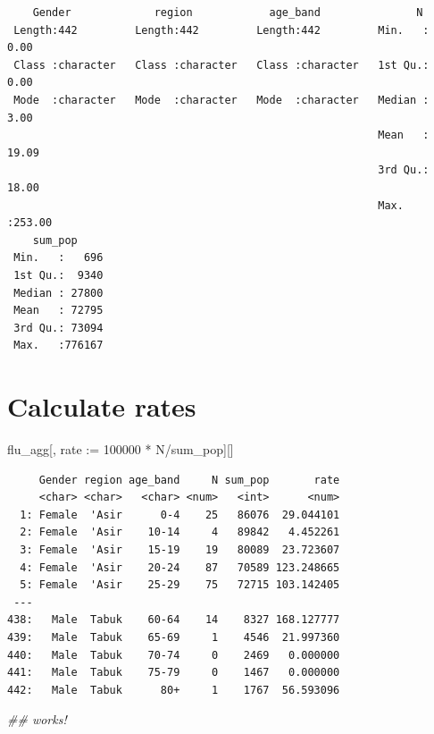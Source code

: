 \documentclass[
  letterpaper,
  DIV=11,
  numbers=noendperiod]{scrreprt}
\newenvironment{Shaded}{\begin{snugshade}}{\end{snugshade}}
\newcommand{\DecValTok}[1]{\textcolor[rgb]{0.68,0.00,0.00}{#1}}
\newcommand{\DocumentationTok}[1]{\textcolor[rgb]{0.37,0.37,0.37}{\textit{#1}}}
\newcommand{\ErrorTok}[1]{\textcolor[rgb]{0.68,0.00,0.00}{#1}}
\newcommand{\NormalTok}[1]{\textcolor[rgb]{0.00,0.23,0.31}{#1}}
\newcommand{\SpecialCharTok}[1]{\textcolor[rgb]{0.37,0.37,0.37}{#1}}
\begin{document}
\begin{verbatim}
    Gender             region            age_band               N         
 Length:442         Length:442         Length:442         Min.   :  0.00  
 Class :character   Class :character   Class :character   1st Qu.:  0.00  
 Mode  :character   Mode  :character   Mode  :character   Median :  3.00  
                                                          Mean   : 19.09  
                                                          3rd Qu.: 18.00  
                                                          Max.   :253.00  
    sum_pop      
 Min.   :   696  
 1st Qu.:  9340  
 Median : 27800  
 Mean   : 72795  
 3rd Qu.: 73094  
 Max.   :776167  
\end{verbatim}

\section{Calculate rates}\label{calculate-rates}

\begin{Shaded}
\begin{Highlighting}[]
\NormalTok{flu\_agg[, rate }\SpecialCharTok{:}\ErrorTok{=} \DecValTok{100000} \SpecialCharTok{*}\NormalTok{ N}\SpecialCharTok{/}\NormalTok{sum\_pop][]}
\end{Highlighting}
\end{Shaded}

\begin{verbatim}
     Gender region age_band     N sum_pop       rate
     <char> <char>   <char> <num>   <int>      <num>
  1: Female  'Asir      0-4    25   86076  29.044101
  2: Female  'Asir    10-14     4   89842   4.452261
  3: Female  'Asir    15-19    19   80089  23.723607
  4: Female  'Asir    20-24    87   70589 123.248665
  5: Female  'Asir    25-29    75   72715 103.142405
 ---                                                
438:   Male  Tabuk    60-64    14    8327 168.127777
439:   Male  Tabuk    65-69     1    4546  21.997360
440:   Male  Tabuk    70-74     0    2469   0.000000
441:   Male  Tabuk    75-79     0    1467   0.000000
442:   Male  Tabuk      80+     1    1767  56.593096
\end{verbatim}

\begin{Shaded}
\begin{Highlighting}[]
\DocumentationTok{\#\# works!}
\end{Highlighting}
\end{Shaded}
\end{document}
